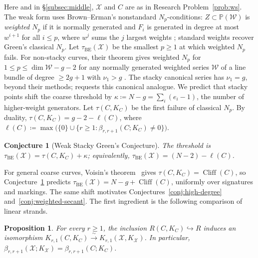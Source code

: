 \documentclass[11pt,reqno]{amsart}
\newtheorem{prop}[lemma]{Proposition}
\newtheorem{conjecture}[lemma]{Conjecture}
\theoremstyle{remark}
\newcommand{\cliff}{\operatorname{Cliff}}
\newcommand{\BE}{\operatorname{BE}}
\newcommand{\PP}{\mathbb{P}}
\newcommand{\cW}{\mathcal{W}}
\newcommand{\cX}{\mathcal{X}}
\begin{document}
Here and in \S\ref{subsec:middle}, $\cX$ and $C$ are as in Research Problem~\ref{prob:ws}. The weak form uses Brown--Erman's nonstandard $N_p$-conditions: $Z\subset\PP(\cW)$ is \emph{weighted $N_p$} if it is normally generated and $F_i$ is generated in degree at most $w^{i+1}$ for all $i\leq p$, where $w^j$ sums the $j$ largest weights \cite[Def.~1.2]{brownErman25}; standard weights recover Green's classical $N_p$. Let $\tau_{\BE}(\cX)$ be the smallest $p\geq1$ at which weighted $N_p$ fails. For non-stacky curves, their theorem gives weighted $N_p$ for $1\leq p\leq\dim\cW-g-2$ for any normally generated weighted series $\cW$ of a line bundle of degree $\ge2g+1$ with $\nu_1>g$ \cite[Thm.~1.7]{brownErman25}. The stacky canonical series has $\nu_1=g$, beyond their methods; \cite[Ques.~7.7]{brownErman25} requests this canonical analogue. We predict that stacky points shift the coarse threshold by $\kappa\coloneqq N-g=\sum_i(e_i-1)$, the number of higher-weight generators. Let $\tau(C,K_C)$ be the first failure of classical $N_p$. By duality, $\tau(C,K_C)=g-2-\ell(C)$, where $\ell(C)\coloneqq\max\bigl(\{0\}\cup \{r\ge1:\beta_{r,r+1}(C;K_C)\ne0\}\bigr)$.

\begin{conjecture}[Weak Stacky Green's Conjecture]\label{con:WSGC}
The threshold is $\tau_{\BE}(\cX)=\tau(C,K_C)+\kappa$; equivalently, $\tau_{\BE}(\cX)=(N-2)-\ell(C)$.
\end{conjecture}

For general coarse curves, Voisin's theorem~\cite{voisin02,voisin05} gives $\tau(C,K_C)=\cliff(C)$, so Conjecture~\ref{con:WSGC} predicts $\tau_{\BE}(\cX)=N-g+\cliff(C)$, uniformly over signatures and markings. The same shift motivates Conjectures~\ref{conj:high-degree} and~\ref{conj:weighted-secant}. The first ingredient is the following comparison of linear strands.

\begin{prop}\label{prop:linear-strand}
For every $r\geq1$, the inclusion $R(C,K_C)\hookrightarrow R$ induces an isomorphism $K_{r,1}(C,K_C)\xrightarrow{\ \sim\ }K_{r,1}(\cX,K_{\cX})$.
In particular, $\beta_{r,r+1}(\cX;K_{\cX})=\beta_{r,r+1}(C;K_C)$.
\end{prop}
\end{document}
